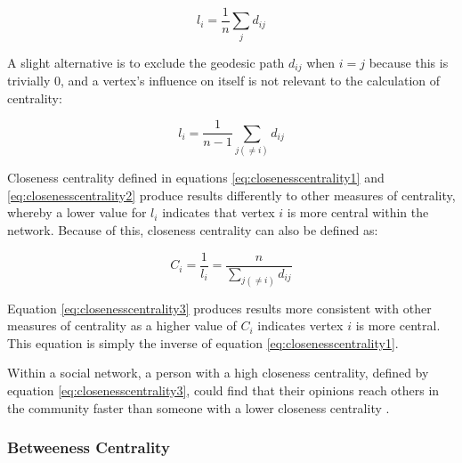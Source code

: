 \begin{equation}
l_i = \frac{1}{n}\sum_{j} d_{ij}
\label{eq:closenesscentrality1}
\end{equation}

A slight alternative is to exclude the geodesic path $d_{ij}$ when $i = j$ because this is trivially 0, and a vertex's influence on itself is not relevant to the calculation of centrality:

\begin{equation}
l_i = \frac{1}{n-1}\sum_{j(\neq i)} d_{ij}
\label{eq:closenesscentrality2}
\end{equation}

Closeness centrality defined in equations \ref{eq:closenesscentrality1} and \ref{eq:closenesscentrality2} produce results differently to other measures of centrality, whereby a lower value for $l_i$ indicates that vertex $i$ is more central within the network. Because of this, closeness centrality can also be defined as:

\begin{equation}
C_i = \frac{1}{l_i} = \frac{n}{\sum_{j(\neq i)} d_{ij}}
\label{eq:closenesscentrality3}
\end{equation}

Equation \ref{eq:closenesscentrality3} produces results more consistent with other measures of centrality as a higher value of $C_i$ indicates vertex $i$ is more central. This equation is simply the inverse of equation \ref{eq:closenesscentrality1}.

Within a social network, a person with a high closeness centrality, defined by equation \ref{eq:closenesscentrality3}, could find that their opinions reach others in the community faster than someone with a lower closeness centrality \cite{newman10}.

\subsubsection{Betweeness Centrality}

